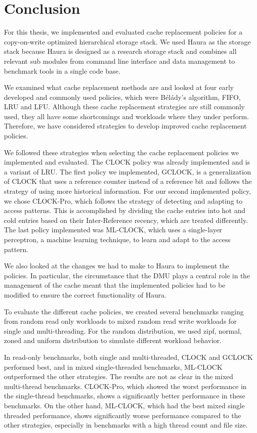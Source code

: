 \documentclass[
	12pt,
	a4paper,
	abstract,
	bibliography=totoc,
	chapterprefix,
	headings=openright,
	numbers=endperiod,
	parskip=half,
	twoside,
]{scrreprt}
\begin{document}
\chapter{Conclusion}
\label{cha:conclusion}

For this thesis, we implemented and evaluated cache replacement policies for a copy-on-write 
optimized hierarchical storage stack.
We used Haura as the storage stack because Haura is designed as a research storage stack and 
combines all relevant sub modules from command line interface and data management 
to benchmark tools in a single code base.

We examined what cache replacement methods are and looked at 
four early developed and commonly used policies, which were  Bélády's algorithm, FIFO, LRU and LFU.
Although these cache replacement strategies are still commonly used, they all have some shortcomings 
and workloads where they under perform.
Therefore, we have considered strategies to develop improved cache replacement policies.

We followed these strategies when selecting the cache replacement policies we implemented and evaluated.
The CLOCK policy was already implemented and is a variant of LRU.
The first policy we implemented, GCLOCK, is a generalization of CLOCK that uses a reference counter 
instead of a reference bit and follows the strategy of using more historical information.
For our second implemented policy, we chose CLOCK-Pro, which follows the strategy of 
detecting and adapting to access patterns.
This is accomplished by dividing the cache entries into hot and cold entries based on 
their Inter-Reference recency, which are treated differently.
The last policy implemented was ML-CLOCK, which uses a single-layer perceptron, 
a machine learning technique, to learn and adapt to the access pattern.

We also looked at the changes we had to make to Haura to implement the policies.
In particular, the circumstance that the DMU plays a central role in the management of the cache 
meant that the implemented policies had to be modified to ensure the correct functionality of Haura.

To evaluate the different cache policies, we created several benchmarks ranging from 
random read only workloads to mixed random read write workloads for single and multi-threading. 
For the random distribution, we used zipf, normal, zoned and uniform distribution to simulate different workload behavior.

In read-only benchmarks, both single and multi-threaded, CLOCK and GCLOCK performed best, 
and in mixed single-threaded benchmarks, ML-CLOCK outperformed the other strategies. 
The results are not as clear in the mixed multi-thread benchmarks.
CLOCK-Pro, which showed the worst performance in the single-thread benchmarks, shows a significantly 
better performance in these benchmarks.
On the other hand, ML-CLOCK, which had the best mixed single threaded performance, 
shows significantly worse performance compared to the other strategies, especially in benchmarks 
with a high thread count and file size.
\end{document}
